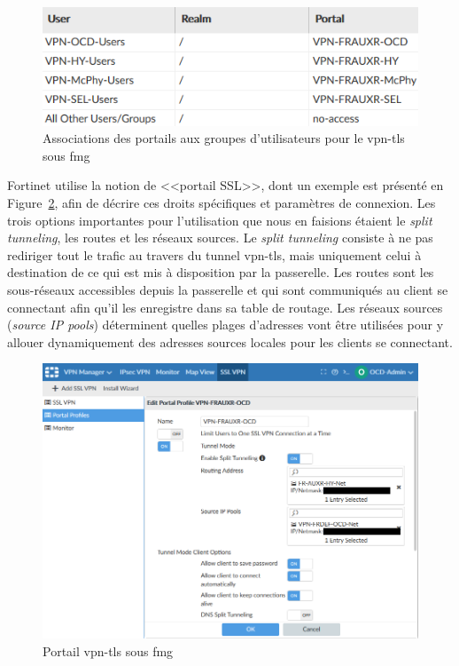 \documentclass[12pt, oneside, a4paper, titlepage]{report}
\begin{document}
\begin{figure}[h!]
    \centering
    \includegraphics[width = 0.8\linewidth]{img/fmg/ssl-mappings.png}
    \caption{%
        Associations des portails aux groupes d'utilisateurs pour le
        \gls{vpn-tls} sous \acrlong{fmg}%
    }%
    \label{fig:fmg/ssl-mappings}
\end{figure}

Fortinet utilise la notion de <<portail SSL>>, dont un exemple est présenté en
Figure~\ref{fig:fmg/ssl-portal}, afin de décrire ces droits spécifiques et
paramètres de connexion. Les trois options importantes pour l'utilisation que
nous en faisions étaient le \textit{split tunneling}, les routes et les réseaux
sources. Le \textit{split tunneling} consiste à ne pas rediriger tout le trafic
au travers du tunnel \gls{vpn-tls}, mais uniquement celui à destination de ce
qui est mis à disposition par la passerelle. Les routes sont les sous-réseaux
accessibles depuis la passerelle et qui sont communiqués au client se connectant
afin qu'il les enregistre dans sa table de routage. Les réseaux sources
(\textit{source IP pools}) déterminent quelles plages d'adresses vont être
utilisées pour y allouer dynamiquement des adresses sources locales pour les
clients se connectant.

\begin{figure}[h!]
    \centering
    \includegraphics[width = \linewidth]{img/fmg/ssl-portal.png}
    \caption{Portail \gls{vpn-tls} sous \acrlong{fmg}}%
    \label{fig:fmg/ssl-portal}
\end{figure}
\end{document}
